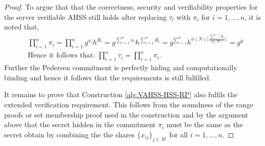 \begin{proof}
To argue that that the correctness, security and verifiability properties for the server verifiable AHSS still holds after replacing  $\tau_i$ with $\pi_i$ for $i=1,...,n$, it is noted that,
\begin{align*}
&\prod_{i=1}^n \pi_i = \prod_{i=1}^n g^{x_i}h^{R_i} = g^{\sum_{i=1}^n x_i}h^{\sum_{i=1}^n R_i} = g^{\sum_{i=1}^n} h^{ \phi(N)\big\lceil \frac{\sum_{i=1}^{n-1}R_i}{\phi(N) }\big\rceil} = g^y \\
&\text{Hence it follows that: } \prod_{i=1}^n \tau_i = \prod_{i=1}^n \pi_i.
\end{align*}
Further the Pedersen commitment is perfectly hiding and computationally binding and hence it follows that the requirements is still fulfilled. 

It remains to prove that Construction \ref{alg:VAHSS-HSS-RP} also fulfils the extended verification requirement. This follows from the soundness of the range proofs or set membership proof used in the construction and by the argument above that the secret hidden in the commitment $\pi_i$ must be the same as the secret obtain by combining the the shares $\{x_{ij}\}_{j\in\mathcal{M}}$ for all $i=1,...,n$.

\end{proof}
